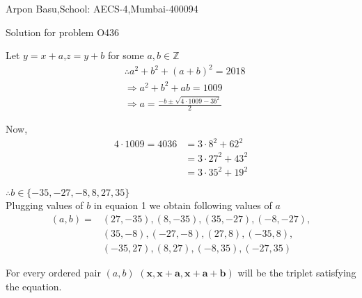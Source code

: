 \documentclass[a4paper,10pt]{article}
\begin{document}
\begin{center}


Arpon Basu,School: AECS-4,Mumbai-400094

Solution for problem O436
\end{center}
Let $y=x+a$,$z=y+b$ for some $a,b \in \mathbb{Z}$\\


 \begin{equation}
    \begin{split}
	&\therefore a^2+b^2+(a+b)^2=2018\\
	&\Rightarrow a^2+b^2+ab=1009\\
        &\Rightarrow a =\frac{-b \pm \sqrt{4\cdot1009-3b^2}}{2}                
    \end{split}
 \end{equation}


Now,
   \begin{equation*} 
    \begin{split}
	4\cdot1009=4036 &= 3\cdot8^2+62^2\\
	                &= 3\cdot27^2+43^2\\  
                        &= 3\cdot35^2+19^2        
    \end{split}
    \end{equation*}

$\therefore b \in \{-35,-27,-8,8,27,35  \}$ \\
Plugging values of $b$ in equaion 1 we obtain following values of $a$\\

\begin{equation*} 
    \begin{split}
(a,b)=&(27,-35),(8,-35),(35,-27),(-8,-27),\\
      &(35,-8),(-27,-8),(27,8),(-35,8),\\
       &(-35,27),(8,27),(-8,35),(-27,35)
\end{split}
    \end{equation*}


For every ordered pair $(a,b)$ $\mathbf{(x,x+a,x+a+b)}$ will be the triplet satisfying the equation.
\end{document}
